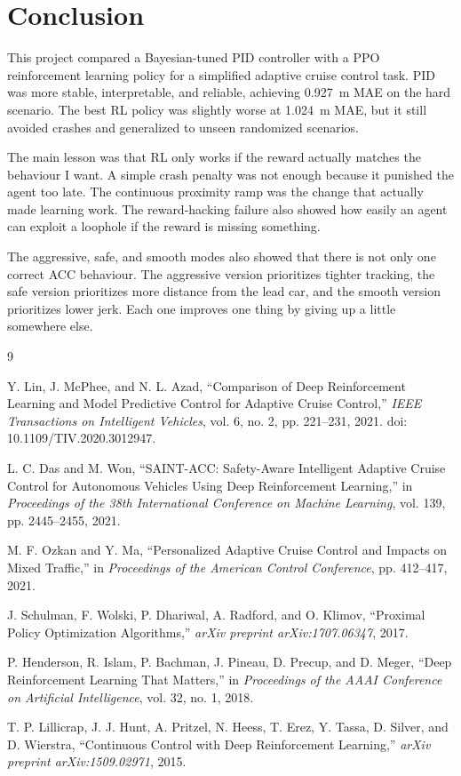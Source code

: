 \documentclass{article}
\begin{document}
\section{Conclusion}

This project compared a Bayesian-tuned PID controller with a PPO reinforcement learning policy for a simplified adaptive cruise control task. PID was more stable, interpretable, and reliable, achieving \SI{0.927}{m} MAE on the hard scenario. The best RL policy was slightly worse at \SI{1.024}{m} MAE, but it still avoided crashes and generalized to unseen randomized scenarios.

The main lesson was that RL only works if the reward actually matches the behaviour I want. A simple crash penalty was not enough because it punished the agent too late. The continuous proximity ramp was the change that actually made learning work. The reward-hacking failure also showed how easily an agent can exploit a loophole if the reward is missing something.

The aggressive, safe, and smooth modes also showed that there is not only one correct ACC behaviour. The aggressive version prioritizes tighter tracking, the safe version prioritizes more distance from the lead car, and the smooth version prioritizes lower jerk. Each one improves one thing by giving up a little somewhere else.



\begin{thebibliography}{9}

Y. Lin, J. McPhee, and N. L. Azad,
``Comparison of Deep Reinforcement Learning and Model Predictive Control for Adaptive Cruise Control,''
\textit{IEEE Transactions on Intelligent Vehicles},
vol. 6, no. 2, pp. 221--231, 2021.
doi: 10.1109/TIV.2020.3012947.

L. C. Das and M. Won,
``SAINT-ACC: Safety-Aware Intelligent Adaptive Cruise Control for Autonomous Vehicles Using Deep Reinforcement Learning,''
in \textit{Proceedings of the 38th International Conference on Machine Learning},
vol. 139, pp. 2445--2455, 2021.

M. F. Ozkan and Y. Ma,
``Personalized Adaptive Cruise Control and Impacts on Mixed Traffic,''
in \textit{Proceedings of the American Control Conference},
pp. 412--417, 2021.

J. Schulman, F. Wolski, P. Dhariwal, A. Radford, and O. Klimov,
``Proximal Policy Optimization Algorithms,''
\textit{arXiv preprint arXiv:1707.06347}, 2017.

P. Henderson, R. Islam, P. Bachman, J. Pineau, D. Precup, and D. Meger,
``Deep Reinforcement Learning That Matters,''
in \textit{Proceedings of the AAAI Conference on Artificial Intelligence},
vol. 32, no. 1, 2018.

T. P. Lillicrap, J. J. Hunt, A. Pritzel, N. Heess, T. Erez,
Y. Tassa, D. Silver, and D. Wierstra,
``Continuous Control with Deep Reinforcement Learning,''
\textit{arXiv preprint arXiv:1509.02971}, 2015.

\end{thebibliography}
\end{document}

